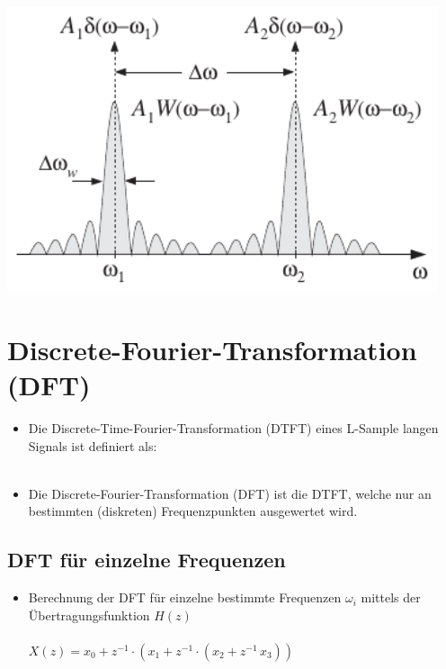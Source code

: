		 \begin{minipage}{0.4\textwidth}
			$ $\\[1.5cm]
			\includegraphics[width = 0.95\textwidth]{pic/frequenzaufloesung.pdf}
		 \end{minipage}
\newpage
\section{Discrete-Fourier-Transformation (DFT)}
	\begin{itemize}
	 \item Die Discrete-Time-Fourier-Transformation (DTFT) eines L-Sample langen Signals ist definiert als:\\[0.2cm]
	 \\
	 \item Die Discrete-Fourier-Transformation (DFT) ist die DTFT, welche nur an bestimmten (diskreten) Frequenzpunkten ausgewertet wird. \\[-0.3cm]
	\end{itemize}
	
	\subsection{DFT für einzelne Frequenzen}
		\begin{itemize}
		\item Berechnung der DFT für einzelne bestimmte Frequenzen $\omega_i$ mittels der Übertragungsfunktion $H(z)$\\[0.2cm]
		\\[0.2cm]
		$X(z) = x_0 + z^{-1}\cdot(x_1 + z^{-1}\cdot(x_2+z^{-1}\,x_3))$\\[-0.3cm]
		\end{itemize}
		
